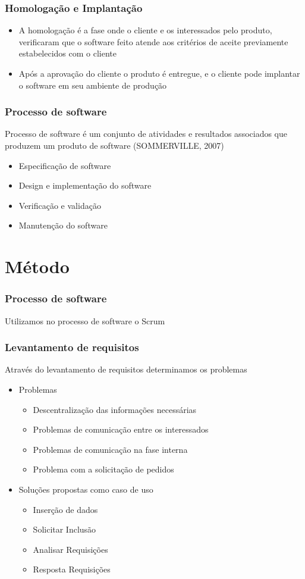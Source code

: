 \documentclass{beamer}
\begin{document}
	\begin{frame}\frametitle{Homologação e Implantação}
		\begin{itemize}
		\item A homologação é a fase onde o cliente e os interessados pelo produto, verificaram que o software feito atende aos critérios de aceite previamente estabelecidos com o cliente
		\item Após a aprovação do cliente o produto é entregue, e o cliente pode implantar o software em seu ambiente de produção
		\end{itemize}
	\end{frame}

	\begin{frame}\frametitle{Processo de software}
		Processo de software é um conjunto de atividades e resultados associados que produzem um produto de software (SOMMERVILLE, 2007)
		\begin{itemize}
			\item Especificação de software
			\item Design e implementação do software
			\item Verificação e validação
			\item Manutenção do software
		\end{itemize}
	\end{frame}

	\section{Método}
	
		\begin{frame}\frametitle{Processo de software}
			
			Utilizamos no processo de software o Scrum
		\end{frame}
	
		\begin{frame}\frametitle{Levantamento de requisitos}
			Através do levantamento de requisitos determinamos os problemas
			\begin{itemize}
				\item Problemas
				\begin{itemize}
					\item Descentralização das informações necessárias
					\item Problemas de comunicação entre os interessados
					\item Problemas de comunicação na fase interna
					\item Problema com a solicitação de pedidos
				\end{itemize}					
				\item Soluções propostas como caso de uso
				\begin{itemize}
					\item Inserção de dados
					\item Solicitar Inclusão
					\item Analisar Requisições
					\item Resposta Requisições
				\end{itemize}
			\end{itemize}
		\end{frame}
	
\end{document}
